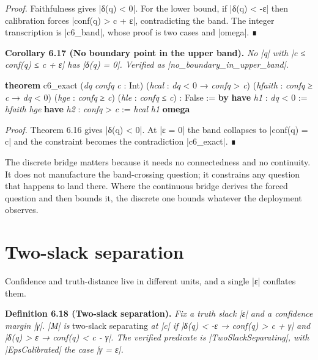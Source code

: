 \documentclass{memoir}
\begin{document}
\emph{Proof.} Faithfulness gives \LeanVerb|δ(q) < 0|. For the lower bound, if \LeanVerb|δ(q) < -ε| then
calibration forces \LeanVerb|conf(q) > c + ε|, contradicting the band. The integer
transcription is \LeanVerb|c6_band|, whose proof is two cases and \LeanVerb|omega|. ∎

\textbf{Corollary 6.17 (No boundary point in the upper band).} \emph{No \LeanVerb|q| with
\LeanVerb|c ≤ conf(q) ≤ c + ε| has \LeanVerb|δ(q) = 0|. Verified as \LeanVerb|no_boundary_in_upper_band|.}

\begin{LeanVerbatim}
\textbf{theorem} c6_exact (\textit{dq} \textit{confq} \textit{c} : Int)
    (\textit{hcal} : \textit{dq} < 0 → \textit{confq} > \textit{c})
    (\textit{hfaith} : \textit{confq} ≥ \textit{c} → \textit{dq} < 0)
    (\textit{hge} : \textit{confq} ≥ \textit{c})
    (\textit{hle} : \textit{confq} ≤ \textit{c}) : False := \textbf{by}
  \textbf{have} \textit{h1} : \textit{dq} < 0 := \textit{hfaith} \textit{hge}
  \textbf{have} \textit{h2} : \textit{confq} > \textit{c} := \textit{hcal} \textit{h1}
  \textbf{omega}

\end{LeanVerbatim}


\emph{Proof.} Theorem 6.16 gives \LeanVerb|δ(q) < 0|. At \LeanVerb|ε = 0| the band collapses to
\LeanVerb|conf(q) = c| and the constraint becomes the contradiction \LeanVerb|c6_exact|. ∎

The discrete bridge matters because it needs no connectedness and no continuity.
It does not manufacture the band-crossing question; it constrains any question
that happens to land there. Where the continuous bridge derives the forced
question and then bounds it, the discrete one bounds whatever the deployment
observes.



\section{Two-slack separation}\label{Two--Schemas--of--Impossibility-005F-005F-005F--Machine--Checked--Limits--of--Trustworthy--Machine--Learning-005F-005F-005F--and--Why--They--Tighten--with--Capability----Approximate--Bridges--to--Real--Models----Two--slack--separation}

Confidence and truth-distance live in different units, and a single \LeanVerb|ε|
conflates them.

\textbf{Definition 6.18 (Two-slack separation).} \emph{Fix a truth slack \LeanVerb|ε| and a confidence
margin \LeanVerb|γ|. \LeanVerb|M| is} two-slack separating \emph{at \LeanVerb|c| if \LeanVerb|δ(q) < -ε → conf(q) > c + γ|
and \LeanVerb|δ(q) > ε → conf(q) < c - γ|. The verified predicate is
\LeanVerb|TwoSlackSeparating|, with \LeanVerb|EpsCalibrated| the case \LeanVerb|γ = ε|.}
\end{document}
